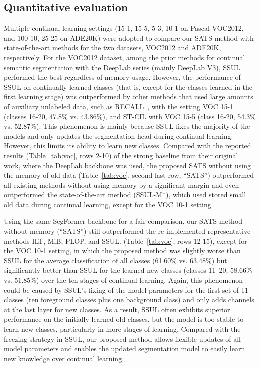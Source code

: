 \documentclass[onecolumn,conference,compsoc]{IEEEtran}
\begin{document}
\begin{spacing}{1.5}
\subsection{Quantitative evaluation}

Multiple continual learning settings (15-1, 15-5, 5-3, 10-1 on Pascal VOC2012, and 100-10, 25-25 on ADE20K) {were} adopted to compare our SATS method with state-of-the-art methods for the two datasets, VOC2012 and ADE20K, {respectively. For} the VOC2012 dataset, among the prior methods for continual semantic segmentation with the DeepLab series (mainly DeepLab V3), SSUL performed the best regardless of  {memory} usage. However, the performance of SSUL on continually learned classes ({that is, except for} the classes learned in the first learning stage) was outperformed by other methods that used large amounts of auxiliary unlabeled data,  {such as} RECALL~\cite{RECALL}, with the setting VOC 15-1 (classes 16-20, 47.8\% vs. 43.86\%), and ST-CIL with VOC 15-5 (class 16-20, 54.3\% vs. 52.87\%). This  {phenomenon} is mainly because SSUL fixes the majority of the models and only updates the segmentation head during continual learning. {However, this} limits its ability  {to learn} new classes. Compared with the reported results (Table~\ref{tab:voc}, rows 2-10) of the strong baseline from their original work, where the DeepLab backbone was used,  {the proposed} SATS without using the memory of old data (Table~\ref{tab:voc}, second last row,  {“SATS”) outperformed} all existing methods without using memory by a significant margin and even  {outperformed} the state-of-the-art method (SSUL-M*), which used stored small old data during continual learning, except for the VOC 10-1 setting.

 {Using} the same SegFormer backbone for a fair comparison, our SATS method without memory (“SATS”) still outperformed the re-implemented representative methods ILT, MiB, PLOP, and SSUL. (Table~\ref{tab:voc}, rows 12-15), except for the VOC 10-1 setting, {in which the proposed} method was slightly worse than SSUL for the average classification of all classes (61.60\% vs. 63.48\%) but significantly better than SSUL for the learned new classes (classes 11–20, 58.66\% vs. 51.85\%) over the ten stages of continual learning. Again, this phenomenon could {be caused by SSUL's fixing of} the model parameters for the first set of 11 classes (ten foreground classes plus one background class) and only adds channels at the last layer for new classes.  {As a result,} SSUL often  {exhibits} superior performance on the initially learned old classes, but the model is too stable to learn new classes, particularly in more stages of learning. Compared with the freezing strategy in SSUL, our proposed method allows flexible updates of all model parameters and enables the updated segmentation model to easily learn new knowledge over continual learning.


\end{spacing}
\end{document}
